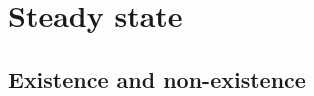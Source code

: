 \documentclass[a4paper,11pt]{amsart}
\theoremstyle{definition}
\numberwithin{equation}{section}
\theoremstyle{definition}
\begin{document}










\section{\bf Steady state}\label{section5}
\subsection{\bf Existence and non-existence}
\end{document}
